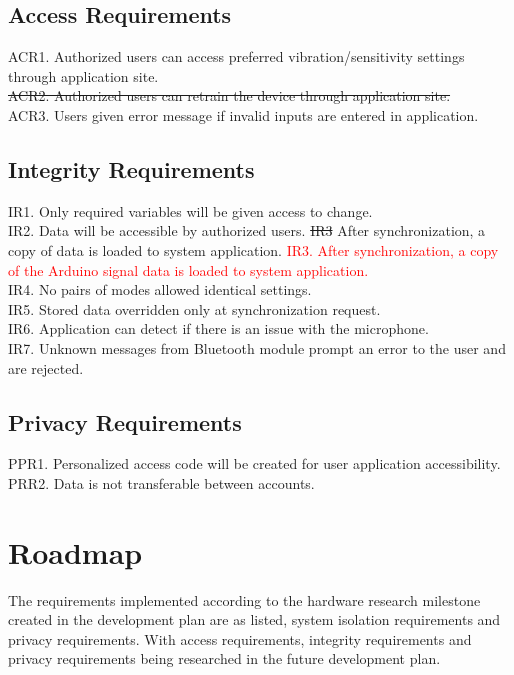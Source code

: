 \documentclass{article}
\begin{document}
\subsection{Access Requirements}

ACR1. Authorized users can access preferred vibration/sensitivity settings through application site.
\sout{\\ACR2. Authorized users can retrain the device through application site.}
\\ACR3. Users given error message if invalid inputs are entered in application.

\subsection{Integrity Requirements}

IR1. Only required variables will be given access to change.
\\IR2. Data will be accessible by authorized users.
\sout{IR3} After synchronization, a copy of data is loaded to system application.
\textcolor{red}{IR3. After synchronization, a copy of the Arduino signal data is loaded to system application.}
\\IR4. No pairs of modes allowed identical settings.
\\IR5. Stored data overridden only at synchronization request.
\\IR6. Application can detect if there is an issue with the microphone.
\\IR7. Unknown messages from Bluetooth module prompt an error to the user and are rejected.
\subsection{Privacy Requirements}

PPR1. Personalized access code will be created for user application accessibility. 
\\PRR2. Data is not transferable between accounts.


\section{Roadmap}

The requirements implemented according to the hardware research milestone created in the development plan are as listed, system isolation requirements and privacy requirements. With access requirements, integrity requirements and privacy requirements being researched in the future development plan.
\end{document}
